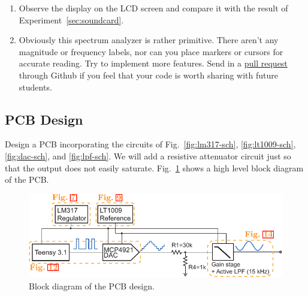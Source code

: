 \documentclass[letterpaper, 11pt]{article}
\begin{document}
\begin{enumerate}
	\item Observe the display on the LCD screen and compare it with the result of Experiment~\ref{sec:soundcard}.
	
	\item Obviously this spectrum analyzer is rather primitive. There aren't any magnitude or frequency labels, nor can you place markers or cursors for accurate reading. Try to implement more features. Send in a \href{https://help.github.com/articles/using-pull-requests/}{pull request} through Github if you feel that your code is worth sharing with future students. 
	
\end{enumerate}

	

\subsection{PCB Design}

Design a PCB incorporating the circuits of Fig.~\ref{fig:lm317-sch}, \ref{fig:lt1009-sch}, \ref{fig:dac-sch}, and \ref{fig:lpf-sch}. We will add a resistive attenuator circuit just so that the output does not easily saturate. Fig.~\ref{fig:pcb-block} shows a high level block diagram of the PCB.

\begin{figure}[ht]
	\centering
	\includegraphics{pcb-block}
	\caption{Block diagram of the PCB design.}
	\label{fig:pcb-block}
\end{figure}
\end{document}
